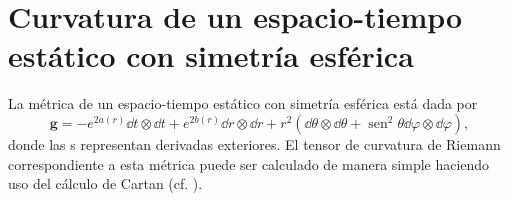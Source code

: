 \chapter{Curvatura de un espacio-tiempo estático con simetría esférica}\label{curvature}

La métrica de un espacio-tiempo estático con simetría esférica está dada por
\begin{equation}
    \bm{g}=-e^{2 a(r)} \dd{t} \otimes \dd{t}+e^{2 b(r)} \dd{r} \otimes \dd{r} +r^{2}\left(\dd{\theta} \otimes \dd{\theta}+\operatorname{sen}^{2} \theta \dd{\varphi} \otimes \dd{\varphi}\right),
\end{equation}
donde las \quotes{$\dd$}s representan derivadas exteriores. El tensor de curvatura de Riemann correspondiente a esta métrica puede ser calculado de manera simple haciendo uso del cálculo de Cartan (cf. \cite{Chandrasekhar1983,Straumann2013}). 

